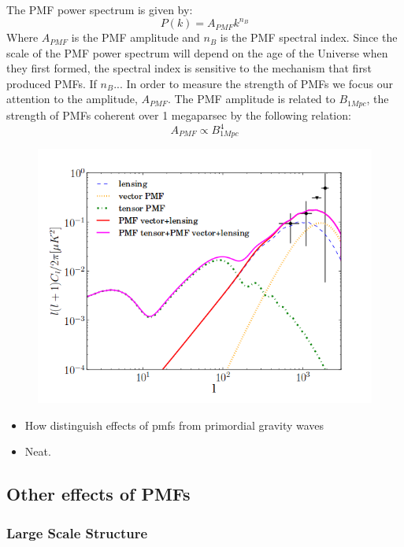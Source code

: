 The PMF power spectrum is given by:
\begin{equation}
P(k) = A_{PMF}k^{n_B}
\end{equation}
Where $A_{PMF}$ is the PMF amplitude and $n_{B}$ is the PMF spectral index. Since the scale of the PMF power spectrum will depend on the age of the Universe when they first formed, the spectral index is sensitive to the mechanism that first produced PMFs. If $n_{B}$...
In order to measure the strength of PMFs we focus our attention to the amplitude, $A_{PMF}$. The PMF amplitude is related to $B_{1Mpc}$, the strength of PMFs coherent over 1 megaparsec by the following relation:
\begin{equation}
A_{PMF} \propto B_{1Mpc}^4
\end{equation}

\begin{figure}
\centering
\includegraphics[scale=0.75]{images/PMFpower.png} 
\caption{}
\end{figure}


\begin{itemize}
\item How distinguish effects of pmfs from primordial gravity waves
\item Neat.

\end{itemize}

\subsection{Other effects of PMFs}

\subsubsection*{Large Scale Structure}


